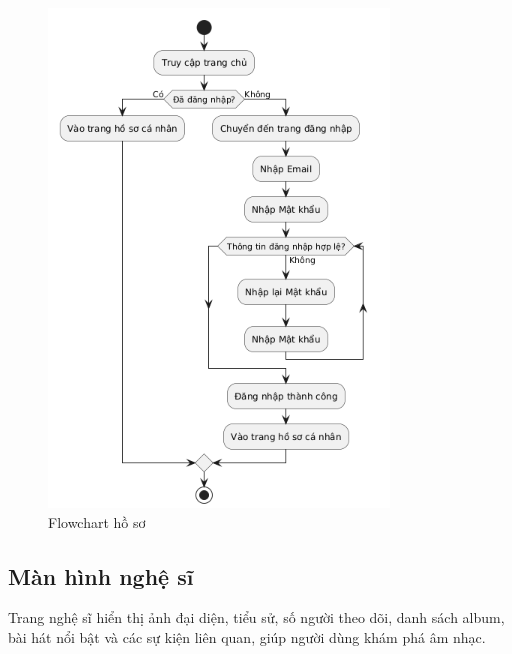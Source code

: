 \begin{figure}
    \centering
    \includegraphics[width=1\linewidth]{images/flowchart-ho-so.png}
    \caption{Flowchart hồ sơ}
    \label{fig:flowchart-ho-so}
\end{figure}

\subsection{Màn hình nghệ sĩ}
\label{subsec:nghe-si}

Trang nghệ sĩ hiển thị ảnh đại diện, tiểu sử, số người theo dõi, danh sách album, bài hát nổi bật và các sự kiện liên quan, giúp người dùng khám phá âm nhạc.

